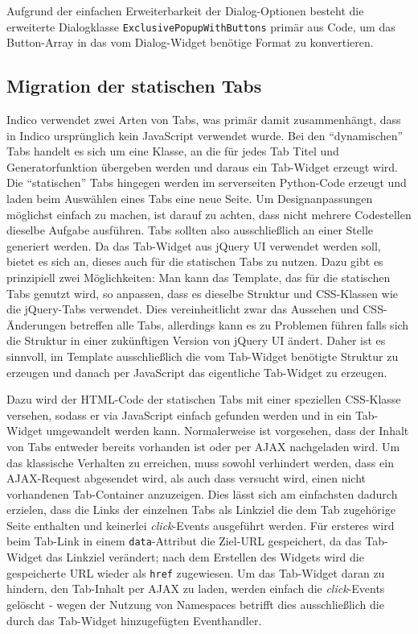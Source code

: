 Aufgrund der einfachen Erweiterbarkeit der Dialog-Optionen besteht die erweiterte Dialogklasse
\lstinline{ExclusivePopupWithButtons} primär aus Code, um das Button-Array in das vom Dialog-Widget
benötige Format zu konvertieren.



\subsection{Migration der statischen Tabs}

Indico verwendet zwei Arten von Tabs, was primär damit zusammenhängt, dass in Indico ursprünglich
kein JavaScript verwendet wurde. Bei den \enquote{dynamischen} Tabs handelt es sich um eine Klasse,
an die für jedes Tab Titel und Generatorfunktion übergeben werden und daraus ein Tab-Widget erzeugt
wird. Die \enquote{statischen} Tabs hingegen werden im serverseiten Python-Code erzeugt und laden
beim Auswählen eines Tabs eine neue Seite. Um Designanpassungen möglichst einfach zu machen, ist
darauf zu achten, dass nicht mehrere Codestellen dieselbe Aufgabe ausführen. Tabs sollten
also ausschließlich an einer Stelle generiert werden. Da das Tab-Widget aus jQuery UI verwendet
werden soll, bietet es sich an, dieses auch für die statischen Tabs zu nutzen. Dazu gibt es
prinzipiell zwei Möglichkeiten: Man kann das Template, das für die statischen Tabs genutzt
wird, so anpassen, dass es dieselbe Struktur und CSS-Klassen wie die jQuery-Tabs verwendet. Dies
vereinheitlicht zwar das Aussehen und CSS-Änderungen betreffen alle Tabs, allerdings kann es zu
Problemen führen falls sich die Struktur in einer zukünftigen Version von jQuery UI ändert. Daher
ist es sinnvoll, im Template ausschließlich die vom Tab-Widget benötigte Struktur zu erzeugen und
danach per JavaScript das eigentliche Tab-Widget zu erzeugen.

Dazu wird der HTML-Code der statischen Tabs mit einer speziellen CSS-Klasse versehen, sodass er via
JavaScript einfach gefunden werden und in ein Tab-Widget umgewandelt werden kann. Normalerweise ist
vorgesehen, dass der Inhalt von Tabs entweder bereits vorhanden ist oder per AJAX nachgeladen wird.
Um das klassische Verhalten zu erreichen, muss sowohl verhindert werden, dass ein AJAX-Request
abgesendet wird, als auch dass versucht wird, einen nicht vorhandenen Tab-Container anzuzeigen. Dies
lässt sich am einfachsten dadurch erzielen, dass die Links der einzelnen Tabs als Linkziel die dem
Tab zugehörige Seite enthalten und keinerlei \emph{click}-Events ausgeführt werden. Für ersteres
wird beim Tab-Link in einem \lstinline{data}-Attribut die Ziel-URL gespeichert, da das Tab-Widget
das Linkziel verändert; nach dem Erstellen des Widgets wird die gespeicherte URL wieder als
\lstinline{href} zugewiesen. Um das Tab-Widget daran zu hindern, den Tab-Inhalt per AJAX zu laden,
werden einfach die \emph{click}-Events gelöscht - wegen der Nutzung von Namespaces betrifft dies
ausschließlich die durch das Tab-Widget hinzugefügten Eventhandler.

